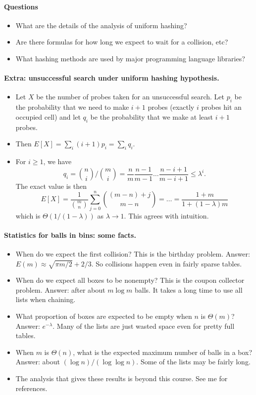 \paragraph{Questions}
\begin{itemize}
\item What are the details of the analysis of uniform hashing?
\item Are there formulas for how long we expect to wait for a collision, etc?
\item What hashing methods are used by major programming language libraries?
\end{itemize}


\paragraph{Extra: unsuccessful search under uniform hashing hypothesis.}
\begin{itemize}
\item Let $X$ be the number of probes taken for an unsuccessful search. 
Let $p_i$ be the probability that we need to make $i+1$ probes 
(exactly $i$ probes hit an occupied cell) and let $q_i$ be the probability 
that we make at least $i+1$ probes. 
\item Then 
$E[X] = \sum_i (i+1) p_i = \sum_i q_i$.
\item For $i \geq 1$, we have
$$ q_i = \binom{n}{i}/\binom{m}{i} = \frac{n}{m} \frac{n-1}{m-1} 
\dots \frac{n - i + 1}{m - i + 1}  \leq \lambda^i.
$$
The exact value is then
$$
E[X] = \frac{1}{\binom{m}{n}} \sum_{j=0}^n \binom{(m-n)+j}{m-n} = 
\dots = \frac{1+m}{1+(1-\lambda)m}
$$
which is $\Theta(1/(1 - \lambda))$ as $\lambda \to 1$. This agrees with 
intuition.
\end{itemize}

\paragraph{Statistics for balls in bins: some facts.}
\begin{itemize}
\item When do we expect the first collision? This is the 
\alert{birthday problem}. Answer: $E(m) \approx \sqrt{\pi m/2} + 2/3$.
So collisions happen even in fairly sparse tables.
\item When do we expect all boxes to be nonempty? This is the 
\alert{coupon collector problem}. Answer: after about $m \log m$ balls. 
It takes a long time to use all lists when chaining.
\item What proportion of boxes are expected to be empty when $n$ is $\Theta(m)$? 
Answer: $e^{-\lambda}$. Many of the lists are just wasted space even for 
pretty full tables.
\item When $m$ is $\Theta(n)$, what is the expected maximum number of balls in a box? 
Answer: about $(\log n)/(\log \log n)$. Some of the lists may be fairly long. 
\item The analysis that gives these results is beyond this course. See me for 
references.
\end{itemize}

